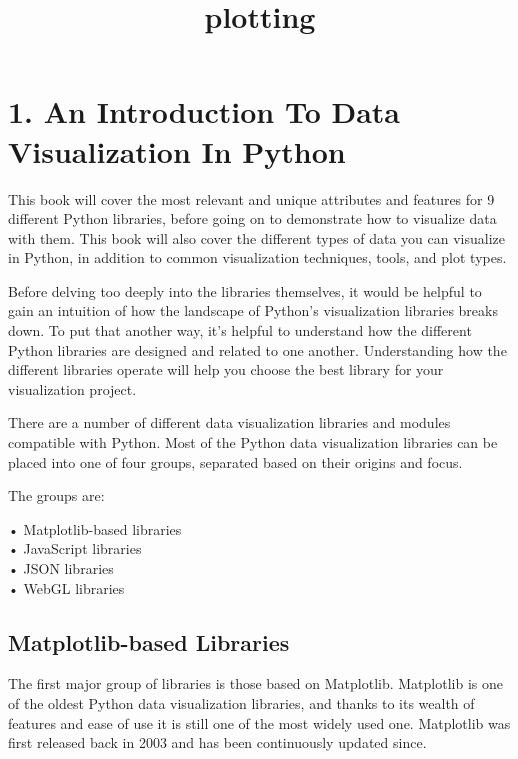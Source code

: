 \documentclass[11pt]{article}
\title{plotting}
\begin{document}
    
    \maketitle
    
    

    
    \section{1. An Introduction To Data Visualization In
Python}\label{an-introduction-to-data-visualization-in-python}

This book will cover the most relevant and unique attributes and
features for 9 different Python libraries, before going on to
demonstrate how to visualize data with them. This book will also cover
the different types of data you can visualize in Python, in addition to
common visualization techniques, tools, and plot types.

Before delving too deeply into the libraries themselves, it would be
helpful to gain an intuition of how the landscape of Python's
visualization libraries breaks down. To put that another way, it's
helpful to understand how the different Python libraries are designed
and related to one another. Understanding how the different libraries
operate will help you choose the best library for your visualization
project.

There are a number of different data visualization libraries and modules
compatible with Python. Most of the Python data visualization libraries
can be placed into one of four groups, separated based on their origins
and focus.

The groups are:

• Matplotlib-based libraries\\
• JavaScript libraries\\
• JSON libraries\\
• WebGL libraries

\subsection{Matplotlib-based
Libraries}\label{matplotlib-based-libraries}

The first major group of libraries is those based on Matplotlib.
Matplotlib is one of the oldest Python data visualization libraries, and
thanks to its wealth of features and ease of use it is still one of the
most widely used one. Matplotlib was first released back in 2003 and has
been continuously updated since.
\end{document}
